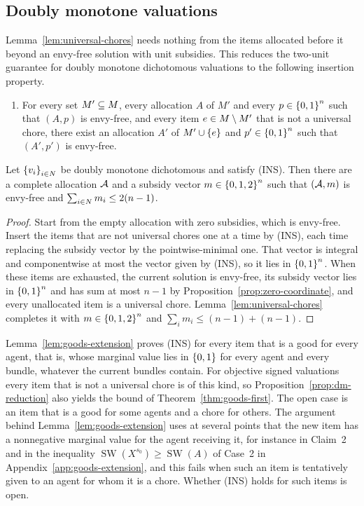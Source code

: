 \subsection{Doubly monotone valuations}
\label{sec:gf-dm}

Lemma~\ref{lem:universal-chores} needs nothing from the items allocated before it
beyond an envy-free solution with unit subsidies. This reduces the two-unit
guarantee for doubly monotone dichotomous valuations to the following insertion
property.
\begin{enumerate}
  \item[(INS)] For every set $M'\subseteq M$, every allocation $A$ of $M'$
    and every $p\in\left\{0,1\right\}^n$ such that $(A,p)$ is envy-free, and every item
    $e\in M\setminus M'$ that is not a universal chore, there exist an
    allocation $A'$ of $M'\cup\left\{e\right\}$ and $p'\in\left\{0,1\right\}^n$ such that
    $(A',p')$ is envy-free.
\end{enumerate}

\begin{proposition}
\label{prop:dm-reduction}
Let $\left\{v_i\right\}_{i\in N}$ be doubly monotone dichotomous and satisfy (INS).
Then there are a complete allocation $\mathcal{A}$ and a subsidy vector
$m\in\left\{0,1,2\right\}^n$ such that $(\mathcal{A},m)$ is envy-free and
$\sum_{i\in N}m_i\le2(n-1)$.
\end{proposition}

\begin{proof}
Start from the empty allocation with zero subsidies, which is envy-free. Insert
the items that are not universal chores one at a time by (INS), each time
replacing the subsidy vector by the pointwise-minimal one. That vector is
integral and componentwise at most the vector given by (INS), so it lies in
$\left\{0,1\right\}^n$. When these items are exhausted, the current solution is envy-free,
its subsidy vector lies in $\left\{0,1\right\}^n$ and has sum at most $n-1$ by
Proposition~\ref{prop:zero-coordinate}, and every unallocated item is a universal
chore. Lemma~\ref{lem:universal-chores} completes it with $m\in\left\{0,1,2\right\}^n$ and
$\sum_i m_i\le(n-1)+(n-1)$.
\end{proof}

Lemma~\ref{lem:goods-extension} proves (INS) for every item that is a good for
every agent, that is, whose marginal value lies in $\left\{0,1\right\}$ for every agent and
every bundle, whatever the current bundles contain. For objective signed
valuations every item that is not a universal chore is of this kind, so
Proposition~\ref{prop:dm-reduction} also yields the bound of
Theorem~\ref{thm:goods-first}. The open case is an item that is a good for some
agents and a chore for others. The argument behind
Lemma~\ref{lem:goods-extension} uses at several points that the new item has a
nonnegative marginal value for the agent receiving it, for instance in Claim~2
and in the inequality $\operatorname{SW}(X^{s_0})\geq\operatorname{SW}(A)$ of
Case~2 in Appendix~\ref{app:goods-extension}, and this fails when such an item is
tentatively given to an agent for whom it is a chore.
Whether (INS) holds for such items is open.
